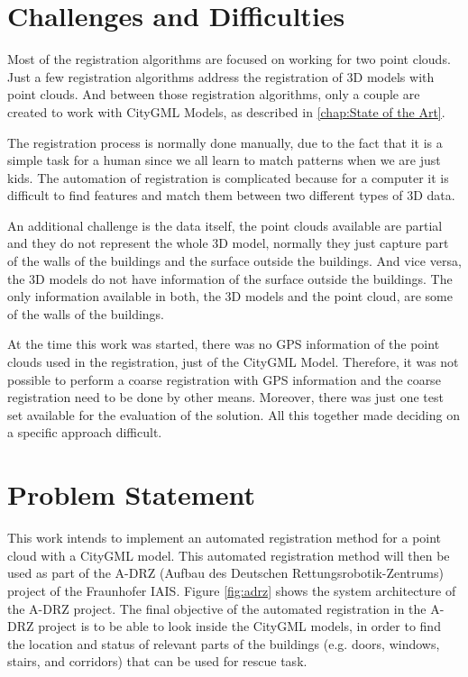     \section{Challenges and Difficulties}
    
        Most of the registration algorithms are focused on working for two point clouds.
        Just a few registration algorithms address the registration of 3D models with point clouds.
        And between those registration algorithms, only a couple are created to work with CityGML Models, as described in \autoref{chap:State of the Art}.
        \par      
        The registration process is normally done manually, due to the fact that it is a simple task for a human since we all learn to match patterns when we are just kids. 
        The automation of registration is complicated because for a computer it is difficult to find features and match them between two different types of 3D data.
        \par
        An additional challenge is the data itself, the point clouds available are partial and they do not represent the whole 3D model, 
        normally they just capture part of the walls of the buildings and the surface outside the buildings.
        And vice versa, the 3D models do not have information of the surface outside the buildings.
        The only information available in both, the 3D models and the point cloud, are some of the walls of the buildings.
        \par
        At the time this work was started, there was no GPS information of the point clouds used in the registration, just of the CityGML Model. 
        Therefore, it was not possible to perform a coarse registration with GPS information and the coarse registration need to be done by other means.
        Moreover, there was just one test set available for the evaluation of the solution.
        All this together made deciding on a specific approach difficult.
        \par

    \section{Problem Statement}
        This work intends to implement an automated registration method for a point cloud with a CityGML model.
        This automated registration method will then be used as part of the A-DRZ (Aufbau des Deutschen Rettungsrobotik-Zentrums) project of the Fraunhofer IAIS.
        Figure \ref{fig:adrz} shows the system architecture of the A-DRZ project. 
        The final objective of the automated registration in the A-DRZ project is to be able to look inside the CityGML models, in order to 
        find the location and status of relevant parts of the buildings (e.g. doors, windows, stairs, and corridors) that can be used for rescue task.

